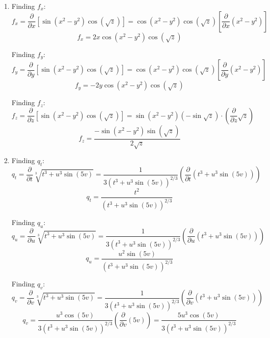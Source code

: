 \begin{Answer}[ref = three]
\begin{enumerate}
    \item Finding $f_x$:
    $$f_x = \frac{\partial}{\partial x} \left[ \sin{ \left( x^2 - y^2 \right)} 
    \cos{ \left( \sqrt{z} \right)} \right] = \cos{ \left(x^2 - y^2 \right)} 
    \cos{ \left( \sqrt{z} \right)} \left[ \frac{\partial}{\partial x} \left( 
    x^2 - y^2 \right) \right]$$
    $$f_x = 2x \cos{ \left(x^2 - y^2 \right)} \cos{ \left( \sqrt{z} \right) }$$

    Finding $f_y$:
    $$f_y = \frac{\partial}{\partial y} \left[ \sin{\left( x^2 - y^2 \right)} 
    \cos{\left( \sqrt{z} \right)} \right] = \cos{ \left( x^2 - y^2 \right)} 
    \cos{ \left( \sqrt{z} \right) } \left[ \frac{\partial}{\partial y} \left(
    x^2 - y^2 \right) \right]$$
    $$f_y = -2y \cos{ \left( x^2 - y^2 \right)} \cos{\left( \sqrt{z} \right)}$$

    Finding $f_z$:
    $$f_z = \frac{\partial}{\partial z} \left[ \sin{\left( x^2 - y^2 \right)} 
    \cos{\left( \sqrt{z} \right)} \right] = \sin{ \left( x^2 - y^2 \right) } 
    \left( -\sin{ \sqrt{z} } \right) \cdot \left( \frac{\partial}{\partial z} 
    \sqrt{z} \right)$$
    $$f_z = \frac{-\sin{ \left( x^2 - y^2 \right)} \sin{ \left( \sqrt{z} 
    \right)}}{2\sqrt{z}}$$

    \item Finding $q_t$:
    $$q_t = \frac{\partial}{\partial t} \sqrt[3]{t^3 + u^3 \sin{ \left(5v 
    \right)}} = \frac{1}{3 \left(t^3 + u^3 \sin{ \left( 5v \right)} \right)^{
    2/3}} \left( \frac{\partial}{\partial t} \left(t^3 + u^3 \sin{ \left(5v 
    \right)} \right) \right)$$
    $$q_t = \frac{t^2}{\left( t^3 + u^3 \sin{\left(5v \right)} \right)^{2/3}}$$

    Finding $q_u$:
    $$q_u = \frac{\partial}{\partial u} \sqrt[3]{t^3 + u^3\sin{\left(5v \right)
    }} = \frac{1}{3 \left( t^3 + u^3 \sin{ \left(5v \right)} \right)^{2/3}} 
    \left( \frac{\partial}{\partial u} \left(t^3 + u^3 \sin{ \left(5 v \right)}
    \right) \right) $$
    $$q_u = \frac{u^2 \sin{ \left( 5v \right) }}{\left( t^3 + u^3 \sin{ \left( 
    5v \right)} \right)^{2/3}}$$

    Finding $q_v$:
    $$q_v = \frac{\partial}{\partial v} \sqrt[3]{t^3 + u^3\sin{\left(5v \right)
    }} = \frac{1}{3 \left(t^3 + u^3 \sin{\left( 5v \right)} \right)^{2/3}} 
    \left( \frac{\partial}{\partial v} \left(t^3 + u^3 \sin{ \left( 5v \right)}
    \right) \right)$$
    $$q_v = \frac{u^3 \cos{ \left( 5v \right)}}{3 \left( t^3 + u^3 \sin{ \left(
    5v \right)} \right)^{2/3}} \left( \frac{\partial}{\partial v} \left( 5v 
    \right) \right) = \frac{5u^3 \cos{ \left( 5v \right)}}{3 \left( t^3 + u^3 
    \sin{ \left( 5v \right)} \right)^{2/3}}$$


\end{enumerate}
\end{Answer}
